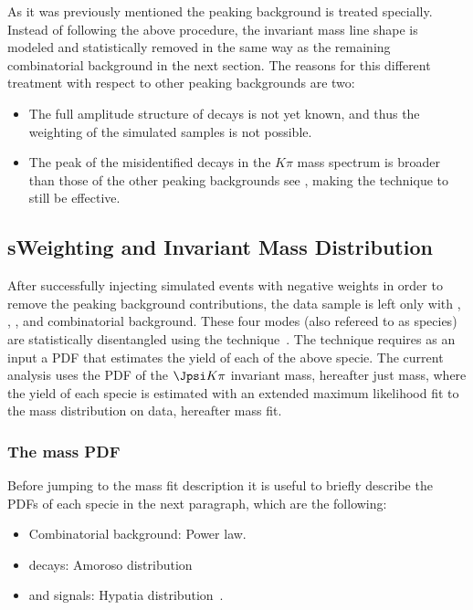 As it was previously mentioned the \LbJpsippi peaking background is treated specially. Instead of following the above
procedure, the \LbJpsippi invariant mass line shape is modeled and statistically removed in the same way as the remaining
combinatorial background in the next section. The reasons for this different treatment with respect to other
peaking backgrounds are two:
\begin{itemize}
\item The full amplitude structure of \LbJpsippi decays is not yet known, and thus the weighting of the simulated samples is not possible. 
\item The peak of the misidentified \LbJpsippi decays in the \Jpsi$K\pi$ mass spectrum is broader than those of the other
      peaking backgrounds see , making the \sPlot technique to still be effective.  
\end{itemize}

\subsection{sWeighting and Invariant Mass Distribution}
\label{sWeighting_and_mass}

After successfully injecting simulated events with negative weights in order to remove the peaking background contributions, the data sample is left only with
\BdJpsiKpi, \BsJpsiKpi, \LbJpsippi, and combinatorial background. These four modes (also refereed to as species) are statistically 
disentangled using the \sPlot technique~\cite{splot}. The technique requires as an input a PDF that estimates the yield of each 
of the above specie. The current analysis uses the PDF of the $\Jpsi K\pi$ invariant mass, hereafter just mass, where the yield of each specie
is estimated with an extended maximum likelihood fit to the mass distribution on data, hereafter mass fit. 

\subsubsection{The mass PDF}
Before jumping to the mass fit description it is useful to briefly describe the PDFs of each specie in the next paragraph, which are the following:  

\begin{itemize}
\item Combinatorial background: Power law.
\item \LbJpsippi decays: Amoroso distribution~\cite{Amoroso}
\item \Bd and \Bs signals: Hypatia distribution~\cite{Santos:2013gra}.
\end{itemize}

